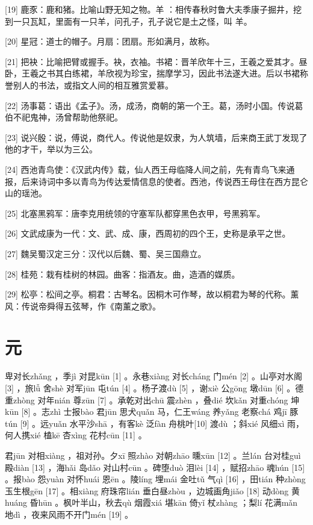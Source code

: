 \documentclass[12pt,UTF8]{ctexbook}
\begin{document}
[19] 鹿豕：鹿和猪。比喻山野无知之物。羊 ：相传春秋时鲁大夫季康子掘井，挖到一只瓦缸，里面有一只羊，问孔子，孔子说它是土之怪，叫 羊。

[20] 星冠：道士的帽子。月扇：团扇。形如满月，故称。

[21] 把袂：比喻把臂或握手。袂，衣袖。书裙：晋羊欣年十三，王羲之爱其才。昼卧，王羲之书其白练裙，羊欣视为珍宝，揣摩学习，因此书法遂大进。后以书裙称誉别人的书法，或指文人间的相互雅赏爱慕。

[22] 汤事葛：语出《孟子》。汤，成汤，商朝的第一个王。葛，汤时小国。传说葛伯不祀鬼神，汤曾帮助他祭祀。

[23] 说兴殷：说，傅说，商代人。传说他是奴隶，为人筑墙，后来商王武丁发现了他的才干，举以为三公。

[24] 西池青鸟使：《汉武内传》载，仙人西王母临降人间之前，先有青鸟飞来通报，后来诗词中多以青鸟为传达爱情信息的使者。西池，传说西王母住在西方昆仑山的瑶池。

[25] 北塞黑鸦军：唐李克用统领的守塞军队都穿黑色衣甲，号黑鸦军。

[26] 文武成康为一代：文、武、成、康，西周初的四个王，史称是承平之世。

[27] 魏吴蜀汉定三分：汉代以后魏、蜀、吴三国鼎立。

[28] 桂苑：栽有桂树的林园。曲客：指酒友。曲，造酒的媒质。

[29] 松亭：松间之亭。桐君：古琴名。因桐木可作琴，故以桐君为琴的代称。薰风：传说帝舜得五弦琴，作《南薰之歌》。





\chapter{元}


卑对长zhǎng ，季jì 对昆kūn [1] 。永巷xiàng 对长cháng 门mén [2] 。山亭对水阁[3] ，旅lǚ 舍shè 对军jūn 屯tún [4] 。杨子渡dù [5] ，谢xiè 公gōng 墩dūn [6] 。德重zhòng 对年nián 尊zūn [7] 。承乾对出chū 震zhèn ，叠dié 坎kǎn 对重chóng 坤kūn [8] 。志zhì 士报bào 君jūn 思犬quǎn 马，仁王wáng 养yǎng 老察chá 鸡jī 豚tún [9] 。远yuǎn 水平沙shā ，有客kè 泛fàn 舟桃叶[10] 渡dù ；斜xié 风细xì 雨，何人携xié 榼kē 杏xìng 花村cūn [11] 。

君jūn 对相xiàng ，祖对孙。夕xī 照zhào 对朝zhāo 曛xūn [12] 。兰lán 台对桂guì 殿diàn [13] ，海hǎi 岛dǎo 对山村cūn 。碑堕duò 泪lèi [14] ，赋招zhāo 魂hún [15] 。报bào 怨yuàn 对怀huái 恩ēn 。陵líng 埋mái 金吐tǔ 气qì [16] ，田tián 种zhòng 玉生根gēn [17] 。相xiàng 府珠帘lián 垂白昼zhòu ，边城画角jiǎo [18] 动dòng 黄huáng 昏hūn 。枫叶半山，秋去qù 烟霞xiá 堪kān 倚yǐ 杖zhàng ；梨lí 花满mǎn 地dì ，夜来风雨不开门mén [19] 。
\end{document}
